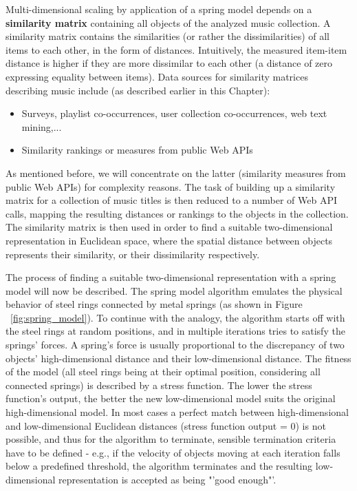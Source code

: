 Multi-dimensional scaling by application of a spring model depends on a \textbf{similarity matrix} containing all objects of the analyzed music collection. A similarity matrix contains the similarities (or rather the dissimilarities) of all items to each other, in the form of distances. Intuitively, the measured item-item distance is higher if they are more dissimilar to each other (a distance of zero expressing equality between items). Data sources for similarity matrices describing music include 
(as described earlier in this Chapter):
\begin{itemize}
	\item Surveys, playlist co-occurrences, user collection co-occurrences, web text mining,... 
	\item Similarity rankings or measures from public Web APIs
\end{itemize}
As mentioned before, we will concentrate on the latter (similarity measures from public Web APIs) for complexity reasons. The task of building up a similarity matrix for a collection of music titles is then reduced to a number of Web API calls, mapping the resulting distances or rankings to the objects in the collection. The similarity matrix is then used in order to find a suitable two-dimensional representation in Euclidean space, where the spatial distance between objects represents their similarity, or their dissimilarity respectively.

The process of finding a suitable two-dimensional representation with a spring model will now be described. The spring model algorithm emulates the physical behavior of steel rings connected by metal springs (as shown in Figure ~\ref{fig:spring_model}). To continue with the analogy, the algorithm starts off with the steel rings at random positions, and in multiple iterations tries to satisfy the springs' forces. A spring's force is usually proportional to the discrepancy of two objects' high-dimensional distance and their low-dimensional distance. The fitness of the model (all steel rings being at their optimal position, considering all connected springs) is described by a stress function. The lower the stress function's output, the better the new low-dimensional model suits the original high-dimensional model. In most cases a perfect match between high-dimensional and low-dimensional Euclidean distances (stress function output = 0) is not possible, and thus for the algorithm to terminate, sensible termination criteria have to be defined - e.g., if the velocity of objects moving at each iteration falls below a predefined threshold, the algorithm terminates and the resulting low-dimensional representation is accepted as being "'good enough"'.


